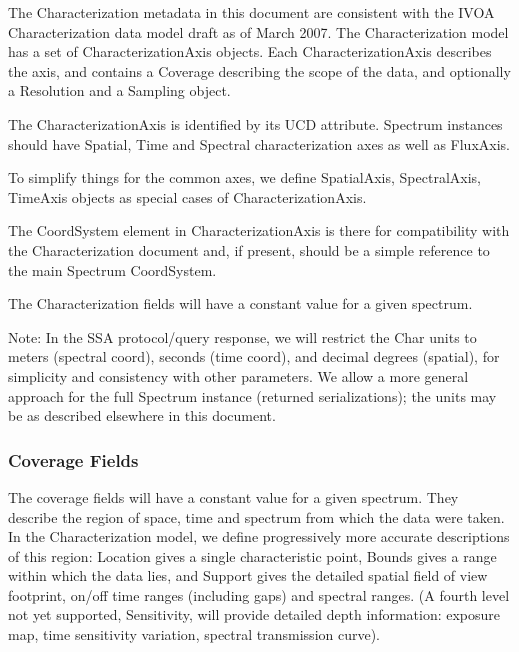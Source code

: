 \documentclass[11pt]{article}
\begin{document}
The Characterization metadata in this document are consistent with
the IVOA Characterization
data model draft as of March 2007. The Characterization model has
a set of CharacterizationAxis objects.  Each CharacterizationAxis
describes
the axis, and contains a Coverage describing the scope of the data, and optionally
a Resolution and a Sampling object. 

The CharacterizationAxis is identified by its UCD attribute.
Spectrum instances should have Spatial, Time and Spectral characterization axes
as well as FluxAxis.


To simplify things for the common axes, we define SpatialAxis, SpectralAxis,
TimeAxis objects as special cases of CharacterizationAxis.

The CoordSystem element in CharacterizationAxis is there for
compatibility with the Characterization document and, if present, should be a simple
reference to the main Spectrum CoordSystem.

The Characterization fields will have a constant value for a given spectrum.

Note: In the SSA protocol/query response, we
will restrict the Char units to meters (spectral coord),
seconds (time coord), and decimal degrees (spatial),
for simplicity and consistency with other parameters.
We allow a more general approach for the full Spectrum 
instance (returned serializations); the units may be
as described elsewhere in this document.


\subsubsection{Coverage Fields}
                        

The coverage fields will have a constant value for a given spectrum.
They describe the region of space, time and spectrum from which the data
were taken. In the Characterization model, we define progressively more
accurate descriptions of this region: Location gives a single
characteristic point, Bounds gives a range within which the data lies,
and Support gives the detailed spatial field of view footprint, on/off
time ranges (including gaps) and spectral ranges. (A fourth level not
yet supported, Sensitivity, will provide detailed depth information:
exposure map, time sensitivity variation, spectral transmission curve).
  
\end{document}

